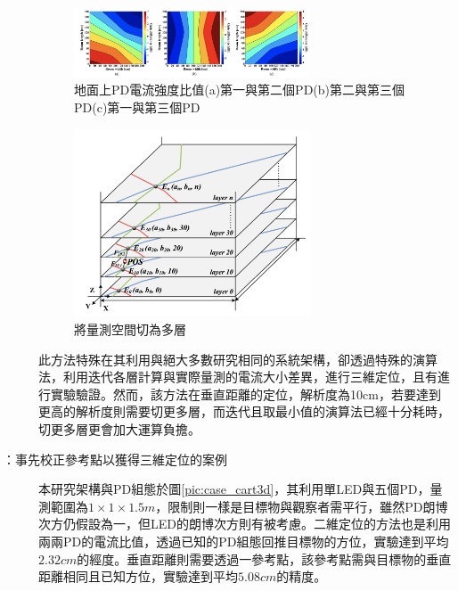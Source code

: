 \begin{description}
        \begin{figure}[h]
            \centering
            \includegraphics[width=7cm]{ch2pic/layers_2d.png}
            \caption{地面上PD電流強度比值(a)第一與第二個PD(b)第二與第三個PD(c)第一與第三個PD\cite{case:3d_layers}}
            \label{pic:layers_2d}
        \end{figure}

        \begin{figure}[h]
            \centering
            \includegraphics[width=7cm]{ch2pic/layers_3d.png}
            \caption{\cite{case:3d_layers}將量測空間切為多層}
            \label{pic:layers_3d}
        \end{figure}

        \qquad
        此方法特殊在其利用與絕大多數研究相同的系統架構，卻透過特殊的演算法，利用迭代各層計算與實際量測的電流大小差異，進行三維定位，且有進行實驗驗證。然而，該方法在垂直距離的定位，解析度為10cm，若要達到更高的解析度則需要切更多層，而迭代且取最小值的演算法已經十分耗時，切更多層更會加大運算負擔。

        \item[\cite{case:cart3d}：事先校正參考點以獲得三維定位的案例] \hfill 
        
        \qquad
        本研究架構與PD組態於圖\ref{pic:case_cart3d}，其利用單LED與五個PD，量測範圍為$1\times 1\times 1.5m$，限制則一樣是目標物與觀察者需平行，雖然PD朗博次方仍假設為一，但LED的朗博次方則有被考慮。二維定位的方法也是利用兩兩PD的電流比值，透過已知的PD組態回推目標物的方位，實驗達到平均$2.32cm$的經度。垂直距離則需要透過一參考點，該參考點需與目標物的垂直距離相同且已知方位，實驗達到平均$5.08cm$的精度。


\end{description}
